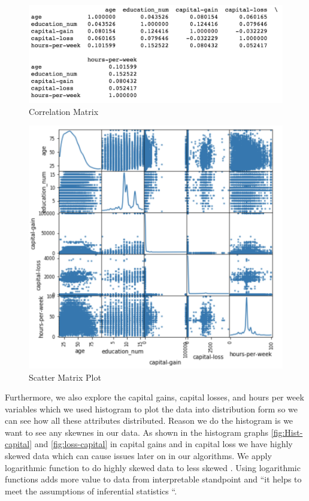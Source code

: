 \documentclass[sigconf]{acmart}
\begin{document}
 \begin{figure}[!ht]
  \centering
      \includegraphics[width=\columnwidth]{project/images/scatter.png}
  \caption{Correlation Matrix \cite{Borga2017}}\label{fig:scatter-matrix}
\end{figure}

 \begin{figure}[!ht]
  \centering
      \includegraphics[width=\columnwidth]{project/images/scatter-matrix.png}
  \caption{Scatter Matrix Plot \cite{Borga2017}}\label{fig:scatter}
\end{figure}

\par Furthermore, we also explore the capital gains, capital losses, and hours per week variables which we used histogram to plot the data into distribution form so we can see how all these attributes distributed. Reason we do the histogram is we want to see any skewnes in our data. As shown in the histogram graphs \ref{fig:Hist-capital} and  \ref{fig:loss-capital} in capital gains and in capital loss we have highly skewed data  which can cause issues later on in our algorithms. We apply logarithmic function to do highly skewed data to less skewed \cite{www-onlinestat}. Using logarithmic functions adds more value to data from interpretable standpoint and ``it helps to meet the assumptions of inferential statistics \cite{www-onlinestat}``.
\end{document}

